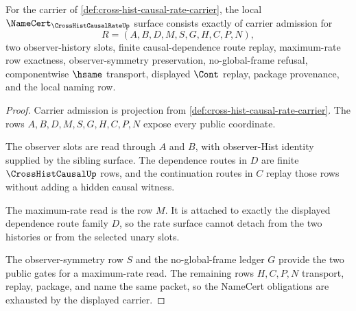\begin{theorem}
\label{thm:cross-hist-causal-rate-namecert-obligations}
For the carrier of \autoref{def:cross-hist-causal-rate-carrier}, the local $\NameCert_{\CrossHistCausalRateUp}$ surface consists exactly of carrier admission for
$$
R=(A,B,D,M,S,G,H,C,P,N),
$$
two observer-history slots, finite causal-dependence route replay, maximum-rate row exactness, observer-symmetry preservation, no-global-frame refusal, componentwise $\hsame$ transport, displayed $\Cont$ replay, package provenance, and the local naming row.
\end{theorem}
\begin{proof}
Carrier admission is projection from \autoref{def:cross-hist-causal-rate-carrier}. The rows $A,B,D,M,S,G,H,C,P,N$ expose every public coordinate.

The observer slots are read through $A$ and $B$, with observer-Hist identity supplied by the sibling surface. The dependence routes in $D$ are finite $\CrossHistCausalUp$ rows, and the continuation routes in $C$ replay those rows without adding a hidden causal witness.

The maximum-rate read is the row $M$. It is attached to exactly the displayed dependence route family $D$, so the rate surface cannot detach from the two histories or from the selected unary slots.

The observer-symmetry row $S$ and the no-global-frame ledger $G$ provide the two public gates for a maximum-rate read. The remaining rows $H,C,P,N$ transport, replay, package, and name the same packet, so the NameCert obligations are exhausted by the displayed carrier.
\end{proof}

